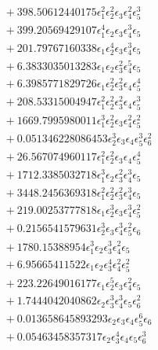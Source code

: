 \documentclass[10pt]{article}
\begin{document}
\begin{align*}
&{}  + 398.50612440175 \epsilon_{1}^{2} \epsilon_{2}^{2} \epsilon_{3} \epsilon_{4}^{2} \epsilon_{5}^{3} \\
&{}  + 399.20569429107 \epsilon_{1}^{4} \epsilon_{2} \epsilon_{3} \epsilon_{4}^{3} \epsilon_{5} \\
&{}  + 201.79767160338 \epsilon_{1} \epsilon_{2}^{4} \epsilon_{3} \epsilon_{4}^{3} \epsilon_{5} \\
&{}  + 6.3833035013283 \epsilon_{1} \epsilon_{2} \epsilon_{3}^{2} \epsilon_{4}^{5} \epsilon_{5} \\
&{}  + 6.3985771829726 \epsilon_{1} \epsilon_{2}^{2} \epsilon_{3}^{2} \epsilon_{4} \epsilon_{5}^{4} \\
&{}  + 208.53315004947 \epsilon_{1}^{2} \epsilon_{2}^{2} \epsilon_{3}^{2} \epsilon_{4} \epsilon_{5}^{3} \\
&{}  + 1669.7995980011 \epsilon_{1}^{3} \epsilon_{2}^{2} \epsilon_{3} \epsilon_{4}^{2} \epsilon_{5}^{2} \\
&{}  + 0.051346228086453 \epsilon_{2}^{3} \epsilon_{3} \epsilon_{4} \epsilon_{5}^{3} \epsilon_{6}^{2} \\
&{}  + 26.567074960117 \epsilon_{1}^{2} \epsilon_{2}^{2} \epsilon_{3} \epsilon_{4} \epsilon_{5}^{4} \\
&{}  + 1712.3385032718 \epsilon_{1}^{3} \epsilon_{2} \epsilon_{3}^{2} \epsilon_{4}^{3} \epsilon_{5} \\
&{}  + 3448.2456369318 \epsilon_{1}^{2} \epsilon_{2}^{2} \epsilon_{3}^{2} \epsilon_{4}^{3} \epsilon_{5} \\
&{}  + 219.00253777818 \epsilon_{1} \epsilon_{2}^{3} \epsilon_{3} \epsilon_{4}^{3} \epsilon_{5}^{2} \\
&{}  + 0.2156541579631 \epsilon_{2}^{3} \epsilon_{3} \epsilon_{4}^{3} \epsilon_{5}^{2} \epsilon_{6} \\
&{}  + 1780.15388954 \epsilon_{1}^{3} \epsilon_{2} \epsilon_{3}^{3} \epsilon_{4}^{2} \epsilon_{5} \\
&{}  + 6.95665411522 \epsilon_{1} \epsilon_{2} \epsilon_{3}^{4} \epsilon_{4}^{2} \epsilon_{5}^{2} \\
&{}  + 223.22649016177 \epsilon_{1} \epsilon_{2}^{5} \epsilon_{3} \epsilon_{4}^{2} \epsilon_{5} \\
&{}  + 1.7444042040862 \epsilon_{2} \epsilon_{3}^{3} \epsilon_{4}^{3} \epsilon_{5} \epsilon_{6}^{2} \\
&{}  + 0.013658645893293 \epsilon_{2} \epsilon_{3} \epsilon_{4} \epsilon_{5}^{6} \epsilon_{6} \\
&{}  + 0.05463458357317 \epsilon_{2} \epsilon_{3}^{4} \epsilon_{4} \epsilon_{5} \epsilon_{6}^{3} \\

\end{align*}
\end{document}
